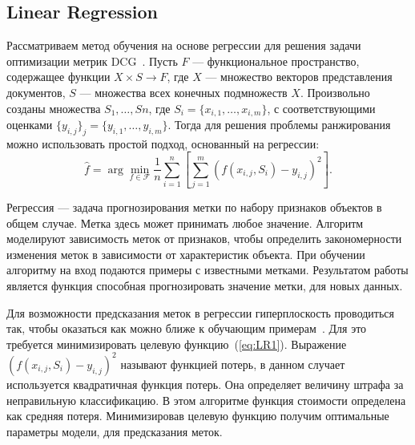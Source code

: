 \subsection{Linear Regression}

Рассматриваем метод обучения на основе регрессии для решения задачи оптимизации метрик DCG~\cite{LR}. Пусть $F$ --- функциональное пространство, содержащее функции $X \times S \to F$, где $X$ --- множество векторов представления документов, $S$ --- множества всех конечных подмножеств $X$. Произвольно созданы множества $S_{1}, \dots, S{n}$, где $S_{i} = \{x_{i,1}, \dots, x_{i,m}\}$, с соответствующими оценками $\{y_{i,j}\}_{j} = \{y_{i,1}, \dots, y_{i,m}\}$. Тогда для решения проблемы ранжирования можно использовать простой подход, основанный на регрессии:
\begin{equation}
	\label{eq:LR1}
	\hat{f}=\arg \min _{f \in \mathcal{F}} \frac{1}{n} \sum_{i=1}^n[\sum_{j=1}^m(f(x_{i, j}, S_i)-y_{i, j})^2].
\end{equation}

Регрессия --- задача прогнозирования метки по набору признаков объектов в общем случае. Метка здесь может принимать любое значение. Алгоритм моделируют зависимость меток от признаков, чтобы определить закономерности изменения меток в зависимости от характеристик объекта. При обучении алгоритму на вход подаются примеры с известными метками. Результатом работы является функция способная прогнозировать значение метки, для новых данных. 

Для возможности предсказания меток в регрессии гиперплоскость проводиться так, чтобы оказаться как можно ближе к обучающим примерам~\cite{ML_no_wors}. Для это требуется минимизировать целевую функцию~(\ref{eq:LR1}). Выражение \\$(f(x_{i, j}, S_i)-y_{i, j})^2$ называют функцией потерь, в данном случает используется квадратичная функция потерь. Она определяет величину штрафа за неправильную классификацию. В этом алгоритме функция стоимости определена как средняя потеря. Минимизировав целевую функцию получим оптимальные параметры модели, для предсказания меток.

